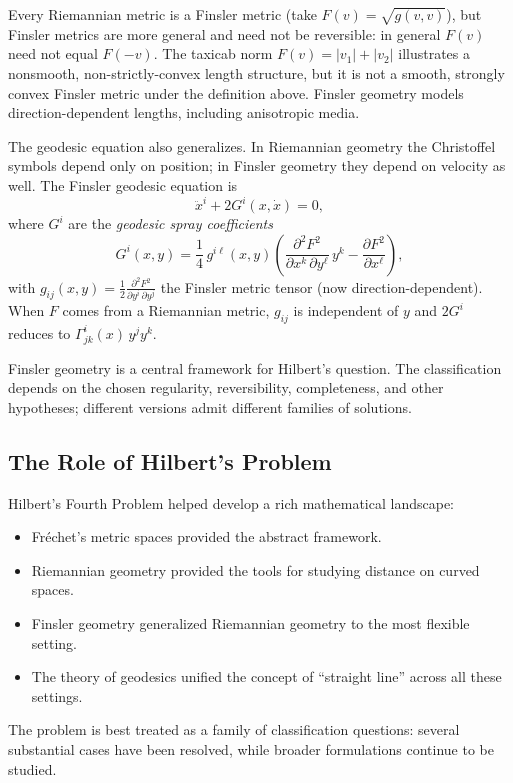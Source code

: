 Every Riemannian metric is a Finsler metric (take $F(v) = \sqrt{g(v,v)}$), but Finsler metrics are more general and need not be reversible: in general $F(v)$ need not equal $F(-v)$. The taxicab norm $F(v)=|v_1|+|v_2|$ illustrates a nonsmooth, non-strictly-convex length structure, but it is not a smooth, strongly convex Finsler metric under the definition above. Finsler geometry models direction-dependent lengths, including anisotropic media.

The geodesic equation also generalizes. In Riemannian geometry the Christoffel symbols depend only on position; in Finsler geometry they depend on velocity as well. The Finsler geodesic equation is
\[
\ddot{x}^i + 2 G^i(x,\dot{x}) = 0,
\]
where $G^i$ are the \emph{geodesic spray coefficients}
\[
G^i(x,y) = \frac{1}{4}\, g^{i\ell}(x,y)\left(
\frac{\partial^2 F^2}{\partial x^k\,\partial y^\ell}\,y^k - \frac{\partial F^2}{\partial x^\ell}
\right),
\]
with $g_{ij}(x,y) = \frac12\frac{\partial^2 F^2}{\partial y^i\,\partial y^j}$ the Finsler metric tensor (now direction-dependent). When $F$ comes from a Riemannian metric, $g_{ij}$ is independent of $y$ and $2G^i$ reduces to $\Gamma^i_{jk}(x)\,y^j y^k$.

Finsler geometry is a central framework for Hilbert's question. The classification depends on the chosen regularity, reversibility, completeness, and other hypotheses; different versions admit different families of solutions.

\subsection{The Role of Hilbert's Problem}

Hilbert's Fourth Problem helped develop a rich mathematical landscape:
\begin{itemize}
    \item Fr\'echet's metric spaces provided the abstract framework.
    \item Riemannian geometry provided the tools for studying distance on curved spaces.
    \item Finsler geometry generalized Riemannian geometry to the most flexible setting.
    \item The theory of geodesics unified the concept of ``straight line'' across all these settings.
\end{itemize}
The problem is best treated as a family of classification questions: several substantial cases have been resolved, while broader formulations continue to be studied.

